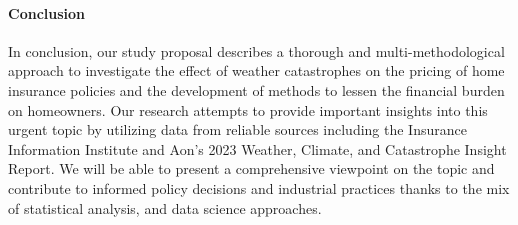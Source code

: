 \documentclass[12pt]{article}
\begin{document}
\paragraph{Conclusion}
In conclusion, our study proposal describes a thorough and multi-methodological approach to investigate the effect of weather 
catastrophes on the pricing of home insurance policies and the development of methods to lessen the financial burden on homeowners. 
Our research attempts to provide important insights into this urgent topic by utilizing data from reliable sources including the 
Insurance Information Institute and Aon's 2023 Weather, Climate, and Catastrophe Insight Report. We will be able to present a 
comprehensive viewpoint on the topic and contribute to informed policy decisions and industrial practices thanks to the mix of 
statistical analysis, and data science approaches.



\end{document}
